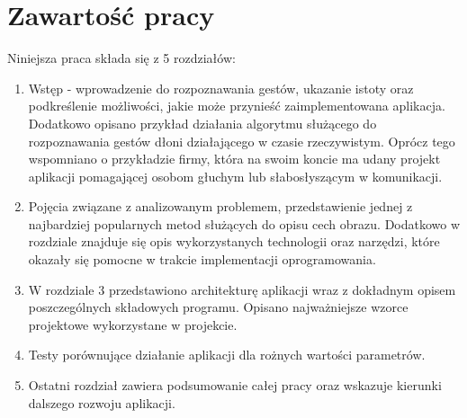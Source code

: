 \section{Zawartość pracy}
\label{sec:zawartoscPracy}
Niniejsza praca składa się z 5 rozdziałów:
\begin{enumerate}
	\item Wstęp - wprowadzenie do rozpoznawania gestów, ukazanie istoty oraz podkreślenie możliwości, jakie może przynieść zaimplementowana aplikacja. Dodatkowo opisano przykład działania algorytmu służącego do rozpoznawania gestów dłoni działającego w czasie rzeczywistym. Oprócz tego wspomniano o przykładzie firmy, która na swoim koncie ma udany projekt aplikacji pomagającej osobom głuchym lub słabosłyszącym w komunikacji.
	\item Pojęcia związane z analizowanym problemem, przedstawienie jednej z najbardziej popularnych metod służących do opisu cech obrazu. Dodatkowo w rozdziale znajduje się opis wykorzystanych technologii oraz narzędzi, które okazały się pomocne w trakcie implementacji oprogramowania.
	\item W rozdziale 3 przedstawiono architekturę aplikacji wraz z dokładnym opisem poszczególnych składowych programu. Opisano najważniejsze wzorce projektowe wykorzystane w projekcie.
	\item Testy porównujące działanie aplikacji dla rożnych wartości parametrów.
	\item Ostatni rozdział zawiera podsumowanie całej pracy oraz wskazuje kierunki dalszego rozwoju aplikacji. 
\end{enumerate}